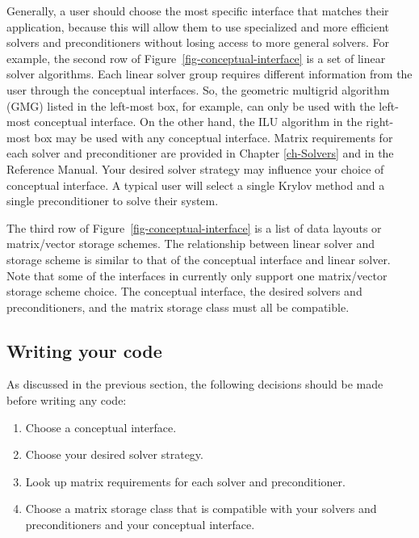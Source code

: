 Generally, a user should choose the most specific interface that
matches their application, because this will allow them to use
specialized and more efficient solvers and preconditioners without
losing access to more general solvers.  For example, the second row of
Figure~\ref{fig-conceptual-interface} is a set of linear solver
algorithms.  Each linear solver group requires different information
from the user through the conceptual interfaces.  So, the geometric
multigrid algorithm (GMG) listed in the left-most box, for example,
can only be used with the left-most conceptual interface.  On the
other hand, the ILU algorithm in the right-most box may be used with
any conceptual interface.  Matrix requirements for each solver and
preconditioner are provided in Chapter \ref{ch-Solvers} and in the
\hypre{} Reference Manual.  Your desired solver strategy may influence
your choice of conceptual interface.  A typical user will select a
single Krylov method and a single preconditioner to solve their system.


The third row of Figure~\ref{fig-conceptual-interface} is a list of
data layouts or matrix/vector storage schemes.  The relationship
between linear solver and storage scheme is similar to that of the
conceptual interface and linear solver.  Note that some of the
interfaces in \hypre{} currently only support one matrix/vector
storage scheme choice.  The conceptual interface, the desired solvers
and preconditioners, and the matrix storage class must all be
compatible.



\subsection{Writing your code}

As discussed in the previous section, the following decisions should
be made before writing any code:

\begin{enumerate}
\item Choose a conceptual interface. 
\item Choose your desired solver strategy.
\item  Look up matrix requirements for each solver and preconditioner.
\item Choose a matrix storage class that is compatible with your solvers and
preconditioners and your conceptual interface.
\end{enumerate}

